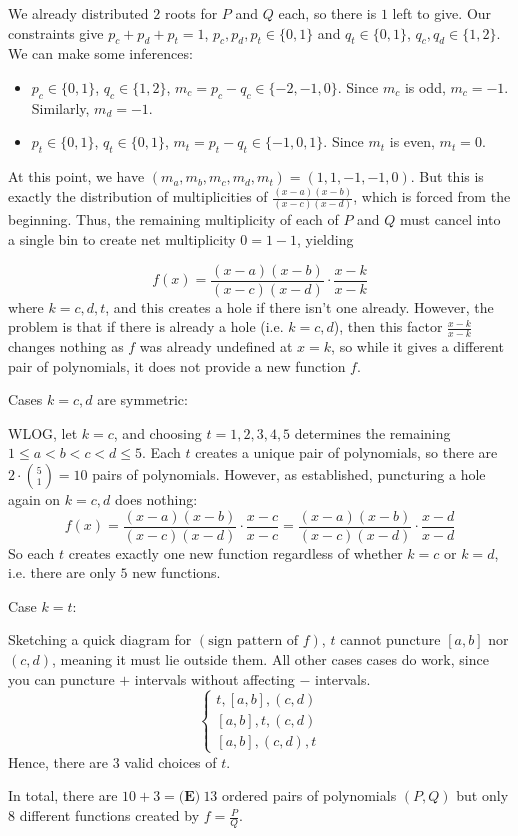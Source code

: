 \begin{enumerate}
 We already distributed $2$ roots for $P$ and $Q$ each, so there is $1$ left to give. Our constraints give $p_{c}+p_{d}+p_{t}=1$, $p_{c},p_{d},p_{t}\in \{ 0,1 \}$ and $q_{t}\in \{0,1\}$, $q_{c}, q_{d}\in \{ 1,2 \}$. We can make some inferences:

 
            \begin{itemize}
        \item $p_{c}\in \{ 0,1 \}$, $q_c \in \{ 1,2 \}$, $m_c=p_{c}-q_{c} \in \{ -2,-1,0 \}$. Since $m_c$ is odd, $m_{c} = -1$. Similarly, $m_{d}=-1$.
        \item $p_{t}\in \{ 0,1 \}$, $q_{t}\in \{ 0,1 \}$, $m_{t}=p_{t}-q_{t}\in \{ -1,0,1 \}$. Since $m_{t}$ is even, $m_{t}=0$.
            \end{itemize}
            At this point, we have $(m_{a},m_{b},m_{c},m_{d},m_{t})=(1,1,-1,-1,0)$. But this is exactly the distribution of multiplicities of $\frac{(x-a)(x-b)}{(x-c)(x-d)}$, which is forced from the beginning. Thus, the remaining multiplicity of each of $P$ and $Q$ must cancel into a single bin to create net multiplicity $0=1-1$, yielding

 
 \[f(x)=\frac{(x-a)(x-b)}{(x-c)(x-d)}\cdot \frac{x-k}{x-k}\]where $k=c,d,t$, and this creates a hole if there isn't one already. However, the problem is that if there is already a hole (i.e. $k=c,d$), then this factor $\frac{x-k}{x-k}$ changes nothing as $f$ was already undefined at $x=k$, so while it gives a different pair of polynomials, it does not provide a new function $f$.

 Cases $k=c,d$ are symmetric:

 WLOG, let $k=c$, and choosing $t=1,2,3,4,5$ determines the remaining $1\le a<b<c<d \le 5$. Each $t$ creates a unique pair of polynomials, so there are $2\cdot \binom{5}{1}=10$ pairs of polynomials. However, as established, puncturing a hole again on $k=c,d$ does nothing:
 \[f(x)=\frac{(x-a)(x-b)}{(x-c)(x-d)}\cdot \frac{x-c}{x-c}=\frac{(x-a)(x-b)}{(x-c)(x-d)}\cdot \frac{x-d}{x-d}\]So each $t$ creates exactly one new function regardless of whether $k=c$ or $k=d$, i.e. there are only $5$ new functions.

 Case $k=t$: 

 Sketching a quick diagram for $(\text{sign pattern of }f)$, $t$ cannot puncture $[a,b]$ nor $(c,d)$, meaning it must lie outside them. All other cases cases do work, since you can puncture $+$ intervals without affecting $-$ intervals.
 \[\begin{cases} t,[a,b],(c,d) \\ [a,b],t,(c,d) \\ [a,b],(c,d),t \end{cases}\]Hence, there are $3$ valid choices of $t$.

 In total, there are $10+3=\boxed{ \textbf{(E)}~13 }$ ordered pairs of polynomials $(P,Q)$ but only $\boxed{ 8 }$ different functions created by $f=\frac{P}{Q}$.

 


\end{enumerate}